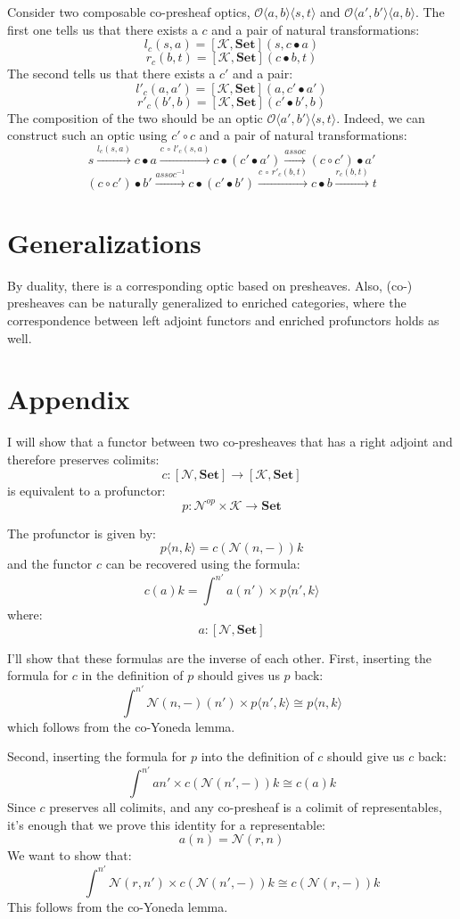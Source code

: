 \documentclass[11pt]{amsart}
\newcommand{\cat}[1]{\mathcal{#1}}%
\newcommand{\Cat}[1]{\mathbf{#1}}%
\newcommand{\Set}{\Cat{Set}}
\begin{document}
Consider two composable co-presheaf optics, $\mathcal{O}\langle a, b\rangle \langle s, t \rangle$ and $\mathcal{O}\langle a', b' \rangle \langle a, b \rangle$. The first one tells us that there exists a $c$ and a pair of natural transformations:
\[ l_c (s,  a ) = [\cat K, \Set] \left(s,  c \bullet a \right) \] 
\[ r_c (b, t) = [\cat K, \Set] \left(c \bullet b, t \right) \]
The second tells us that there exists a $c'$ and a pair:
\[ l'_c (a,  a' ) = [\cat K, \Set] \left(a,  c' \bullet a' \right) \] 
\[ r'_c (b', b) = [\cat K, \Set] \left(c' \bullet b', b \right) \]
The composition of the two should be an optic $\mathcal{O}\langle a', b'\rangle \langle s, t \rangle$. Indeed, we can construct such an optic using $c' \circ c$ and a pair of natural transformations:
\[s \xrightarrow{l_c (s,  a )} c \bullet a \xrightarrow{c \,\circ \, l'_c (s,  a )} c \bullet (c' \bullet a')
  \xrightarrow{assoc} (c \circ c') \bullet a'\]
\[ (c \circ c') \bullet b' \xrightarrow{assoc^{-1}} c \bullet (c' \bullet b') \xrightarrow{c \, \circ \, r'_c (b, t)} c \bullet b
 \xrightarrow{r_c (b, t)}  t \]
 
\section{Generalizations}

By duality, there is a corresponding optic based on presheaves. Also, (co-) presheaves can be naturally generalized to enriched categories, where the correspondence between left adjoint functors and enriched profunctors holds as well. 

\section{Appendix}

I will show that a functor between two co-presheaves that has a right adjoint and therefore preserves colimits:
\[ c \colon [\cat N, \Set] \to [\cat K, \Set] \]
is equivalent to a profunctor:
\[p \colon \cat N^{op} \times \cat K \to \Set \]

The profunctor is given by:
\[p \langle n, k \rangle = c ( \cat N(n, -)) k \]
and the functor $c$ can be recovered using the formula:
\[ c (a) k = \int^{n'} a (n') \times p \langle n', k \rangle \]
where:
\[ a \colon [\cat N, \Set] \]

I'll show that these formulas are the inverse of each other. First, inserting the formula for $c$ in the definition of $p$ should gives us $p$ back:
\[  \int^{n'} \cat N(n, -) (n') \times p\langle n', k \rangle \cong  p \langle n, k \rangle \]
which follows from the co-Yoneda lemma.

Second, inserting the formula for $p$ into the definition of $c$ should give us $c$ back:
\[  \int^{n'} a n' \times c(\cat N(n', -)) k  \cong c (a) k  \]
Since $c$ preserves all colimits, and any co-presheaf is a colimit of representables, it's enough that we prove this identity for a representable:
\[ a (n) = \cat N (r, n) \]
We want to show that:
\[ \int^{n'}  \cat N (r, n')  \times  c(\cat N(n', -)) k \cong  c ( \cat N (r, -) ) k\]
This follows from the co-Yoneda lemma.
\end{document}
